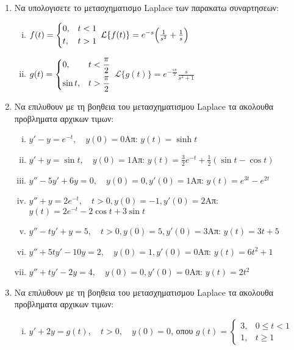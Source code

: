 \begin{enumerate}
\begin{enumerate}[i)]
\end{enumerate}

\item Να υπολογισετε το μετασχηματισμο \textlatin{Laplace} των παρακατω συναρτησεων:

\begin{enumerate}[i)]

\item $f(t)=\begin{dcases} 0, & t<1 \\ t, & t>1 \end{dcases}$ \hfill 
$\mathcal{L}\{f(t)\}=e^{-s}\Bigl(\frac{1}{s^2}+\frac{1}{s}\Bigr)$

\item $g(t)=\begin{dcases} 0, & t<\frac{\pi}{2} \\ \sin t, & t>\frac{\pi}{2} \end{dcases}$ \hfill $\mathcal{L}\{g(t)\}=e^{-\frac{s\pi}{2}}\frac{s}{s^2+1}$

\end{enumerate}

\item Να επιλυθουν με τη βοηθεια του μετασχηματισμου \textlatin{Laplace} τα ακολουθα προβληματα αρχικων τιμων:

\begin{enumerate}[i)]

\item $y'-y=e^{-t},\quad y(0)=0$\hfill Απ: $y(t)=\sinh t$
\item $y'+y=\sin t,\quad y(0)=1$\hfill Απ: $y(t)=\frac{3}{2}e^{-t}+\frac{1}{2}(\sin t-\cos t)$
\item $y''-5y'+6y=0,\quad y(0)=0, y'(0)=1$\hfill Απ: $y(t)=e^{3t}-e^{2t}$
\item $y''+y=2e^{-t},\quad t>0, y(0)=-1, y'(0)=2$\hfill Απ: $y(t)=2e^{-t}-2\cos t+3\sin t$
\item $y''-ty'+y=5, \quad t>0, y(0)=5, y'(0)=3$\hfill Απ: $y(t)=3t+5$
\item $y'' +5ty'-10y=2, \quad y(0)=1, y'(0)=0$\hfill Απ: $y(t)=6t^2+1$
\item $y'' +ty'-2y=4, \quad y(0)=0, y'(0)=0$\hfill Απ: $y(t)=2t^2$
\end{enumerate}

\item Να επιλυθουν με τη βοηθεια του μετασχηματισμου \textlatin{Laplace} τα ακολουθα προβληματα αρχικων τιμων:

\begin{enumerate}[i)]
\item $y'+2y=g(t),\quad t>0,\quad y(0)=0$, οπου $g(t)=\begin{cases}3, & 0\leq t<1 \\ 1, & t\geq 1\end{cases}$


\end{enumerate}
\end{enumerate}
